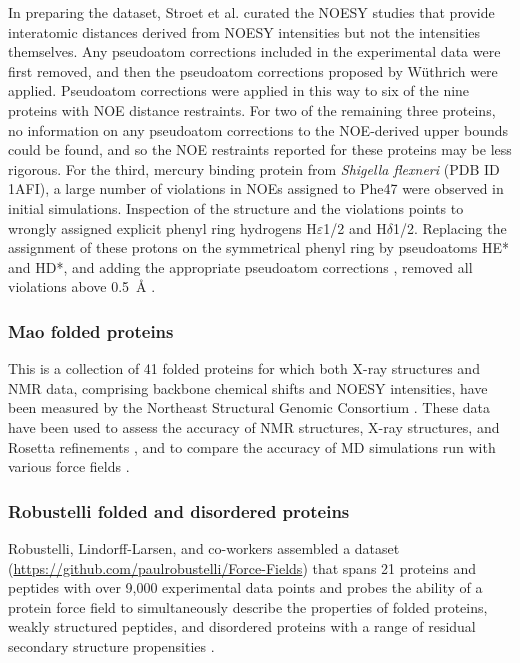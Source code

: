 \documentclass[9pt,review,pubversion]{livecoms}
\begin{document}
In preparing the dataset, Stroet et al. curated the NOESY studies that provide interatomic distances derived from NOESY intensities but not the intensities themselves.
Any pseudoatom corrections included in the experimental data were first removed, and then the pseudoatom corrections proposed by W\"{u}thrich \cite{wuthrich_nmr_1986} were applied.
Pseudoatom corrections were applied in this way to six of the nine proteins with NOE distance restraints.
For two of the remaining three proteins, no information on any pseudoatom corrections to the NOE-derived upper bounds could be found, and so the NOE restraints reported for these proteins may be less rigorous.
For the third, mercury binding protein from \textit{Shigella flexneri} (PDB ID 1AFI), a large number of violations in NOEs assigned to Phe47 were observed in initial simulations.
Inspection of the structure and the violations points to wrongly assigned explicit phenyl ring hydrogens H$\varepsilon$1/2 and H$\delta$1/2.
Replacing the assignment of these protons on the symmetrical phenyl ring by pseudoatoms HE* and HD*, and adding the appropriate pseudoatom corrections \cite{wuthrich_nmr_1986}, removed all violations above \qty{0.5}{\angstrom} \cite{stroet_validation_2024}.

\subsubsection{Mao folded proteins}
\label{sub2:mao}

This is a collection of 41 folded proteins for which both X-ray structures and NMR data, comprising backbone chemical shifts and NOESY intensities, have been measured by the Northeast Structural Genomic Consortium \cite{mao_protein_2014}.
These data have been used to assess the accuracy of NMR structures, X-ray structures, and Rosetta refinements \cite{mao_protein_2014}, and to compare the accuracy of MD simulations run with various force fields \cite{robustelli_developing_2018,piana_development_2020}.

\subsubsection{Robustelli folded and disordered proteins}
\label{sub2:robustelli}

Robustelli, Lindorff-Larsen, and co-workers assembled a dataset (\url{https://github.com/paulrobustelli/Force-Fields}) that spans 21 proteins and peptides with over 9,000 experimental data points and probes the ability of a protein force field to simultaneously describe the properties of folded proteins, weakly structured peptides, and disordered proteins with a range of residual secondary structure propensities \cite{lindorff-larsen_improved_2010,lindorff2012systematic,piana_water_2015,robustelli_developing_2018,piana_development_2020}.
\end{document}
